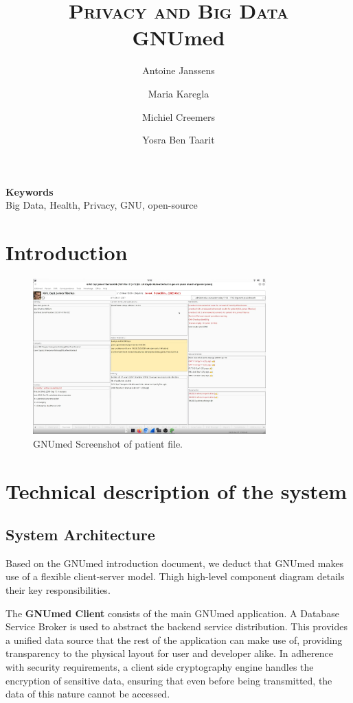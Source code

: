 \documentclass[10pt,onecolcolumn,letterpaper]{article}
\title{
		\usefont{OT1}{bch}{b}{n}
		\normalfont \normalsize \textsc{Privacy and Big Data} \\ [10pt]
		\huge GNUmed \\
}
\author[1]{Antoine Janssens}
\author[1]{Maria Karegla}
\author[2]{Michiel Creemers}
\author[2]{Yosra Ben Taarit}
\affil[1]{\small{Advanced Master's in Cybersecurity}}
\affil[2]{Master of Artificial Intelligence}
\begin{document}
\maketitle

\begin{abstract}

\end{abstract}


{\textbf{Keywords} \\
Big Data, Health, Privacy, GNU, open-source} %

\section{Introduction}
\begin{figure}[h!]
    \centering 
    \includegraphics[width=0.8\textwidth]{Screenshot_Gnumed.png}
    \caption{GNUmed Screenshot of patient file. }
    \label{fig:gnumed_screen_img} 
\end{figure}

\section{Technical description of the system}
\subsection{System Architecture}

Based on the GNUmed introduction document\cite{gnumed_development_team_gnumed-introduction_v4pdf_2005}, we deduct that GNUmed makes use of a flexible client-server model. Thigh high-level component diagram details their key responsibilities.

The \textbf{GNUmed Client} consists of the main GNUmed application. A Database Service Broker is used to abstract the backend service distribution. This provides a unified data source that the rest of the application can make use of, providing transparency to the physical layout for user and developer alike. In adherence with security requirements, a client side cryptography engine handles the encryption of sensitive data, ensuring that even before being transmitted, the data of this nature cannot be accessed. 
\end{document}
